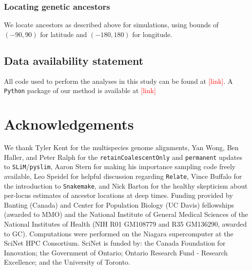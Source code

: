 \documentclass[12pt]{article}
\newcommand{\mo}[1]{\textcolor{red}{[#1]}} %
\begin{document}
\subsubsection*{Locating genetic ancestors}

We locate ancestors as described above for simulations, using bounds of $(-90,90)$ for latitude and  $(-180,180)$ for longitude.

\subsection*{Data availability statement}

All code used to perform the analyses in this study can be found at \mo{link}.
A \texttt{Python} package of our method is available at \mo{link}

\section*{Acknowledgements}

We thank Tyler Kent for the multispecies genome alignments,
Yan Wong, Ben Haller, and Peter Ralph for the \texttt{retainCoalescentOnly} and \texttt{permanent} updates to \texttt{SLiM}/\texttt{pyslim}, 
Aaron Stern for making his importance sampling code freely available, 
Leo Speidel for helpful discussion regarding \texttt{Relate}, 
Vince Buffalo for the introduction to \texttt{Snakemake},
and Nick Barton for the healthy skepticism about per-locus estimates of ancestor locations at deep times.
%
Funding provided by Banting (Canada) and Center for Population Biology (UC Davis) fellowships (awarded to MMO) and the National Institute of General Medical Sciences of the National Institutes of Health (NIH R01 GM108779 and R35 GM136290, awarded to GC).
Computations were performed on the Niagara supercomputer at the SciNet HPC Consortium. SciNet is funded by: the Canada Foundation for Innovation; the Government of Ontario; Ontario Research Fund - Research Excellence; and the University of Toronto.

%
\end{document}
